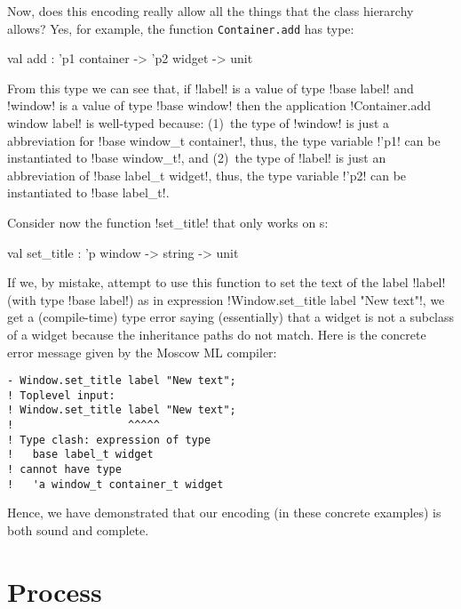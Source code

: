 \documentclass[workingdraft]{usetex-v1}
\begin{document}
Now, does this encoding really allow all the things that the class
hierarchy allows?  Yes, for example, the function
\texttt{Container.add} has type:
\begin{SMLcode}
val add : 'p1 container -> 'p2 widget 
                                 -> unit
\end{SMLcode}
From this type we can see that, if !label! is a value of type 
%
!base label! 
% 
and !window! is a value of type !base window! then
the application
%
!Container.add window label!
%
is well-typed because: (1)~the type of !window! is just a abbreviation for 
%
!base window_t container!,
%
thus, the type variable !'p1! can be instantiated to 
%
!base window_t!,
% 
and (2)~the type of !label! is just an abbreviation of 
%
!base label_t widget!,
%
thus, the type variable !'p2! can be instantiated to 
%
!base label_t!.

Consider now the function !set_title! that only works on s:
\begin{SMLcode}
val set_title : 'p window -> string -> unit
\end{SMLcode}
If we, by mistake, attempt to use this function to set the text of the
label !label! (with type !base label!) as in expression
%
!Window.set_title label "New text"!, 
%
we get a (compile-time) type error saying (essentially) that a
 widget is not a subclass of a 
widget because the inheritance paths do not match.  Here is the
concrete error message given by the Moscow ML compiler:
\begin{verbatim}
- Window.set_title label "New text";
! Toplevel input:
! Window.set_title label "New text";
!                  ^^^^^
! Type clash: expression of type
!   base label_t widget
! cannot have type
!   'a window_t container_t widget
\end{verbatim}

Hence, we have demonstrated that our encoding (in these concrete
examples) is both sound and complete.




\section{Process}
\label{sec:process}
\end{document}

